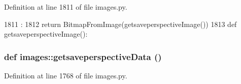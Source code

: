 Definition at line 1811 of file images.py.


\begin{DoxyCode}
1811                               :
1812     return BitmapFromImage(getsaveperspectiveImage())
1813 
def getsaveperspectiveImage():
\end{DoxyCode}
\hypertarget{namespaceimages_adb1657e897a64cb53071cc74ed9c6b87}{
\subsubsection[{getsaveperspectiveData}]{\setlength{\rightskip}{0pt plus 5cm}def images::getsaveperspectiveData ()}}
\label{namespaceimages_adb1657e897a64cb53071cc74ed9c6b87}


Definition at line 1768 of file images.py.


